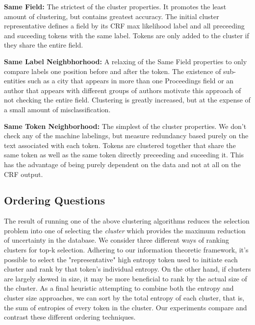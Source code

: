 \textbf{Same Field:} The strictest of the cluster properties.  It promotes the least amount of clustering, but contains greatest accuracy.  The initial cluster representative defines a field by its CRF max likelihood label and all preceeding and suceeding tokens with the same label.  Tokens are only added to the cluster if they share the entire field.

\textbf{Same Label Neighbhorhood:} A relaxing of the Same Field properties to only compare labels one position before and after the token.  The existence of sub-entities such as a city that appears in more than one Proceedings field or an author that appears with different groups of authors motivate this approach of not checking the entire field.  Clustering is greatly increased, but at the expense of a small amount of misclassification.

\textbf{Same Token Neighborhood:} The simplest of the cluster properties.  We don't check any of the machine labelings, but measure redundancy based purely on the text associated with each token.  Tokens are clustered together that share the same token as well as the same token directly preceeding and suceeding it.  This has the advantage of being purely dependent on the data and not at all on the CRF output.


\subsection{Ordering Questions}

The result of running one of the above clustering algorithms reduces the selection problem into one of selecting the \textit{cluster} which provides the maximum reduction of uncertainty in the database.  We consider three different ways of ranking clusters for top-k selection.  Adhering to our information theoretic framework, it's possible to select the "representative" high entropy token used to initiate each cluster and rank by that token's individual entropy.  On the other hand, if clusters are largely skewed in size, it may be more beneficial to rank by the actual size of the cluster.  As a final heuristic attempting to combine both the entropy and cluster size approaches, we can sort by the total entropy of each cluster, that is, the sum of entropies of every token in the cluster.  Our experiments compare and contrast these different ordering techniques. 
